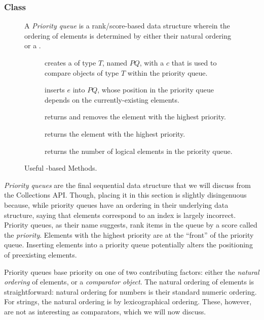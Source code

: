 \subsubsection*{ Class}
\begin{figure}[tp]
  \small
  \begin{tcolorbox}[title=Java PriorityQueue]
    A \emph{Priority queue} is a rank/score-based data structure wherein the ordering of elements is determined by either their natural ordering or a .
    \vspace{2ex}
  \begin{description}
    \item [] creates a  of type $T$, named $PQ$, with a  $c$ that is used to compare objects of type $T$ within the priority queue.
     \item [] inserts $e$ into $PQ$, whose position in the priority queue depends on the currently-existing elements.
     \item [] returns and removes the element with the highest priority.
     \item [] returns the element with the highest priority.
    \item [] returns the number of logical elements in the priority queue.
  \end{description}
\end{tcolorbox}
  \caption{Useful -based Methods.}
  \label{fig:priorityqueues}
\end{figure}

\emph{Priority queues} are the final sequential data structure that we will discuss from the Collections API\@. Though, placing it in this section is slightly disingenuous because, while priority queues have an ordering in their underlying data structure, saying that elements correspond to an index is largely incorrect. Priority queues, as their name suggests, rank items in the queue by a score called the \emph{priority}. Elements with the highest priority are at the ``front'' of the priority queue. Inserting elements into a priority queue potentially alters the positioning of preexisting elements.

Priority queues base priority on one of two contributing factors: either the \emph{natural ordering} of elements, or a \emph{comparator object}. The natural ordering of elements is straightforward: natural ordering for numbers is their standard numeric ordering. For strings, the natural ordering is by lexicographical ordering. These, however, are not as interesting as comparators, which we will now discuss.

